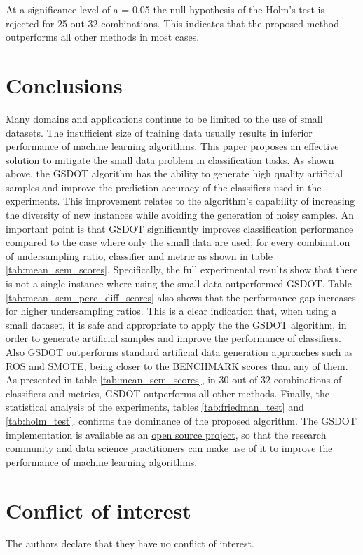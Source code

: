 At a significance level of a = 0.05 the null hypothesis of the Holm's test is
rejected for 25 out 32 combinations. This indicates that the proposed method
outperforms all other methods in most cases.  

\section{Conclusions}
\label{conclusions}

Many domains and applications continue to be limited to the use of small datasets. The insufficient size of training data usually results in inferior performance of machine learning algorithms. This paper proposes an effective solution to mitigate the small data problem in classification tasks. As shown above, the GSDOT algorithm has the ability to generate high quality artificial samples and improve the prediction accuracy of the classifiers used in the experiments. This improvement relates to the algorithm's capability of increasing the diversity of new instances while avoiding the generation of noisy samples. An important point is that GSDOT significantly improves classification performance compared to the case where only the small data are used, for every combination of undersampling ratio, classifier and metric as shown in table \ref{tab:mean_sem_scores}. Specifically, the full experimental results show that there is not a single instance where using the small data outperformed GSDOT. Table \ref{tab:mean_sem_perc_diff_scores} also shows that the performance gap increases for higher undersampling ratios. This is a clear indication that, when using a small dataset, it is safe and appropriate to apply the the GSDOT algorithm, in order to generate artificial samples and improve the performance of classifiers. Also GSDOT outperforms standard artificial data generation approaches such as ROS and SMOTE, being closer to the BENCHMARK scores than any of them. As presented in table \ref{tab:mean_sem_scores}, in 30 out of 32 combinations of classifiers and metrics, GSDOT outperforms all other methods. Finally, the statistical analysis of the experiments, tables \ref{tab:friedman_test} and \ref{tab:holm_test}, confirms the dominance of the proposed algorithm. The GSDOT implementation is available as an \href{https://geometric-smote.readthedocs.io/en/latest/?badge=latest}{open source project}, so that the research community and data science practitioners can make use of it to improve the performance of machine learning algorithms.

\section*{Conflict of interest}
The authors declare that they have no conflict of interest.







